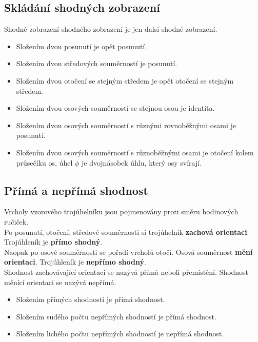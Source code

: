    \subsection{Skládání shodných zobrazení}
        Shodné zobrazení shodného zobrazení je jen dalsí shodné zobrazení.
        \begin{itemize}
            \item Složením dvou posunutí je opět posunutí.
            \item Složením dvou středových souměrností je posunutí.
            \item Složením dvou otočení se stejným středem je opět otočení se stejným středem.
            \item Složením dvou osových souměrností se stejnou osou je identita.
            \item Složením dvou osových souměrností s různými rovnoběžnými osami je posunutí.
            \item Složením dvou osových souměrností s různoběžnými osami je otočení kolem průsečíku os, úhel $\phi$ je dvojnásobek úhlu, který osy svírají.
        \end{itemize}

    \subsection{Přímá a nepřímá shodnost}
        Vrcholy vzorového trojúhelníku jsou pojmenovány proti směru hodinových ručiček.\\
        Po posunutí, otočení, středové souměrnosti si trojúhelník \textbf{zachová orientaci}. Trojúhleník je \textbf{přímo shodný}.\\
        Naopak po osové souměrnosti se pořadí vrcholů otočí. Osová souměrnost \textbf{mění orientaci}. Trojúhleník je \textbf{nepřímo shodný}.\\
        Shodnost zachovávající orientaci se nazývá přímá neboli přemístění. Shodnost měnící orientaci se nazývá nepřímá.\\
        \begin{itemize}
            \item Složením přímých shodností je přímá shodnost.
            \item Složením sudého počtu nepřímých shodností je přímá shodnost.
            \item Složením lichého počtu nepřímých shodností je nepřímá shodnost.
        \end{itemize}